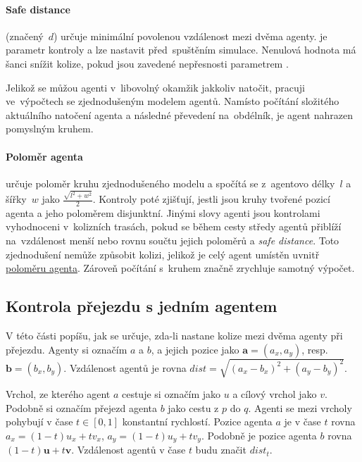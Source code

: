 \paragraph{Safe distance}\label{par:safe_distance} (značený~$d$) určuje minimální povolenou vzdálenost mezi dvěma agenty.
 je parametr kontroly a lze nastavit před~spuštěním simulace.
Nenulová hodnota  má šanci snížit kolize,
pokud jsou zavedené nepřesnosti parametrem .

Jelikož se můžou agenti v~libovolný okamžik jakkoliv natočit, pracuji ve~výpočtech se zjednodušeným modelem agentů.
Namísto počítání složitého aktuálního natočení agenta a následné převedení na~obdélník,
je agent nahrazen pomyslným kruhem.

\paragraph{Poloměr agenta}\label{par:polomer_agenta} určuje poloměr kruhu zjednodušeného modelu
a spočítá se z~agentovo délky~$l$ a šířky~$w$ jako $\frac{\sqrt {l^2 + w^2}}{2}$.
Kontroly poté zjišťují, jestli jsou kruhy tvořené pozicí agenta a jeho poloměrem disjunktní.
Jinými slovy agenti jsou kontrolami vyhodnoceni v~kolizních trasách,
pokud se během cesty středy agentů přiblíží na~vzdálenost menší nebo rovnu součtu jejich poloměrů a \emph{safe distance}.
Toto zjednodušení nemůže způsobit kolizi, jelikož je celý agent umístěn uvnitř \hyperref[par:polomer_agenta]{poloměru agenta}.
Zároveň počítání s~kruhem značně zrychluje samotný výpočet.

\subsection{Kontrola přejezdu s jedním agentem}\label{subsec:kontrola_prejezdu_jeden_agent}

V této části popíšu, jak se určuje, zda-li nastane kolize mezi dvěma agenty při přejezdu.
Agenty si označím $a$ a $b$, a jejich pozice jako $\mathbf{a} = (a_x, a_y)$, resp. $\mathbf{b} = (b_x, b_y)$.
Vzdálenost agentů je rovna $dist = \sqrt{(a_x - b_x)^2 + (a_y - b_y)^2}$.

Vrchol, ze kterého agent $a$ cestuje si označím jako $u$ a cílový vrchol jako $v$.
Podobně si označím přejezd agenta $b$ jako cestu z $p$ do $q$.
Agenti se mezi vrcholy pohybují v čase $t \in [0, 1]$ konstantní rychlostí.
Pozice agenta $a$ je v čase $t$ rovna $a_x = (1-t)u_x + tv_x$, $a_y = (1-t)u_y + tv_y$.
Podobně je pozice agenta $b$ rovna $(1-t)\mathbf{u} + t\mathbf{v}$.
Vzdálenost agentů v čase $t$ budu značit $dist_t$.

